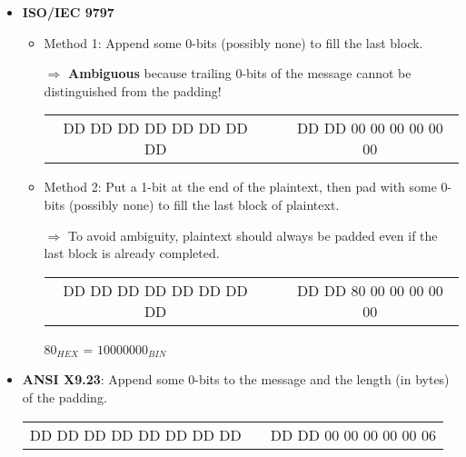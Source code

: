 \begin{itemize}

    \item \textbf{ISO/IEC 9797}
        \begin{itemize}
            \item Method 1: Append some 0-bits (possibly none) to fill
                the last block.
                
                $\Rightarrow$ \textbf{Ambiguous} because trailing 0-bits
                of the message cannot be distinguished from the padding!
                \begin{center}
                    \begin{tabular}{|c|c|c|}
                        \cline{1-1} \cline{3-3}
                        DD DD DD DD DD DD DD DD & & DD DD
                        \textcolor{red!50!black}{00 00 00 00 00 00} \\
                        \cline{1-1} \cline{3-3}
                    \end{tabular}
                \end{center}
                
            \item Method 2: Put a 1-bit at the end of the plaintext, then pad with
                some 0-bits (possibly none) to fill the last block of plaintext. 
                
                $\Rightarrow$ To avoid ambiguity, plaintext should
                always be padded even if the last block is already
                completed.
                \begin{center}
                    \begin{tabular}{|c|c|c|}
                        \cline{1-1} \cline{3-3}
                        DD DD DD DD DD DD DD DD & & DD DD
                        \textcolor{green!50!black}{80}
                        \textcolor{red!50!black}{00 00 00 00 00} \\
                        \cline{1-1} \cline{3-3}
                    \end{tabular}
                \end{center}

                $80_{HEX}$ = $10000000_{BIN}$
        \end{itemize}

    \item \textbf{ANSI X9.23}: Append some 0-bits to the message and the
        length (in bytes) of the padding.
                \begin{center}
                    \begin{tabular}{|c|c|c|}
                        \cline{1-1} \cline{3-3}
                        DD DD DD DD DD DD DD DD & & DD DD
                        \textcolor{red!50!black}{00 00 00 00 00}
                        \textcolor{green!50!black}{06}\\
                        \cline{1-1} \cline{3-3}
                    \end{tabular}
                \end{center}


\end{itemize}
